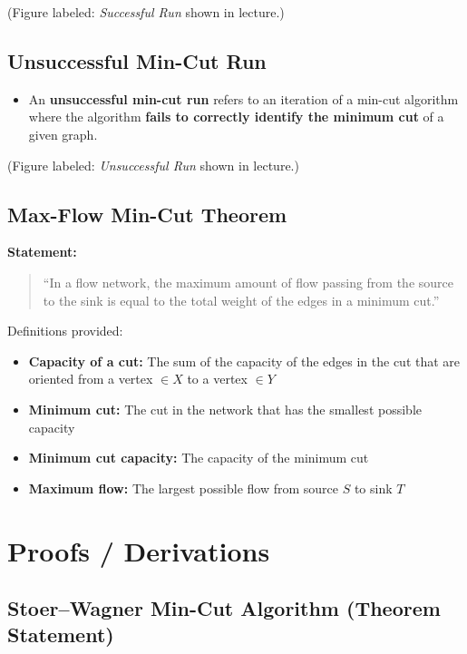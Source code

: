 \documentclass[11pt]{article}
\begin{document}
(Figure labeled: \textit{Successful Run} shown in lecture.)

\subsection{Unsuccessful Min-Cut Run}

\begin{itemize}
    \item An \textbf{unsuccessful min-cut run} refers to an iteration of a min-cut algorithm where the algorithm \textbf{fails to correctly identify the minimum cut} of a given graph.
\end{itemize}

(Figure labeled: \textit{Unsuccessful Run} shown in lecture.)

\subsection{Max-Flow Min-Cut Theorem}

\textbf{Statement:}

\begin{quote}
``In a flow network, the maximum amount of flow passing from the source to the sink is equal to the total weight of the edges in a minimum cut.''
\end{quote}

Definitions provided:

\begin{itemize}
    \item \textbf{Capacity of a cut:}  
    The sum of the capacity of the edges in the cut that are oriented from a vertex \( \in X \) to a vertex \( \in Y \)
    \item \textbf{Minimum cut:}  
    The cut in the network that has the smallest possible capacity
    \item \textbf{Minimum cut capacity:}  
    The capacity of the minimum cut
    \item \textbf{Maximum flow:}  
    The largest possible flow from source \( S \) to sink \( T \)
\end{itemize}

\section{Proofs / Derivations}

\subsection{Stoer--Wagner Min-Cut Algorithm (Theorem Statement)}
\end{document}

